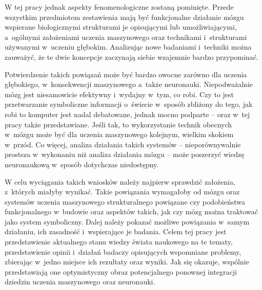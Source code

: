 W tej pracy jednak aspekty fenomenologiczne zostaną pominięte.
Przede wszystkim przedmiotem zestawienia mają być funkcjonalne działanie mózgu wspierane biologicznymi strukturami je opisującymi lub umożliwiającymi, a~ogólnymi założeniami uczenia maszynowego oraz technikami i~strukturami używanymi w~uczeniu głębokim.
Analizując nowe badaniami i~techniki można zauważyć, że te dwie koncepcje zaczynają siebie wzajemnie bardzo przypominać.

Potwierdzenie takich powiązań może być bardzo owocne zarówno dla uczenia głębokiego, w~konsekwencji maszynowego a~także neuronauki.
Niepodważalnie mózg jest niesamowicie efektywny i~wydajny w~tym, co robi.
Czy to jest przetwarzanie symboliczne informacji o~świecie w~sposób zbliżony do tego, jak robi to komputer jest nadal debatowane, jednak mocno podparte -- oraz w~tej pracy także przedstawiane.
Jeśli tak, to wykorzystanie technik obecnych w~mózgu może być dla uczenia maszynowego kolejnym, wielkim skokiem w~przód.
Co więcej, analiza działania takich systemów -- nieporównywalnie prostsza w~wykonaniu niż analiza działania mózgu -- może poszerzyć wiedzę neuronaukową w~sposób dotychczas niedostępny.

W celu wyciągania takich wniosków należy najpierw sprawdzić założenia, z~których miałyby wynikać.
Takie powiązania wymagałoby od mózgu oraz systemów uczenia maszynowego strukturalnego powiązane czy podobieństwa funkcjonalnego w~budowie oraz aspektów takich, jak czy mózg można traktować jako system symboliczny.
Dalej należy pokazać możliwe powiązania w~samym działaniu, ich zasadność i~wspierające je badania.
Celem tej pracy jest przedstawienie aktualnego stanu wiedzy świata naukowego na te tematy, przedstawienie opinii i~działań badaczy opisujących wspomniane problemy, zbierając w~jedno miejsce ich rezultaty oraz wyniki.
Jak się okazuje, wspólnie przedstawiają one optymistyczny obraz potencjalnego ponownej integracji dziedzin uczenia maszynowego oraz neuronauki.
